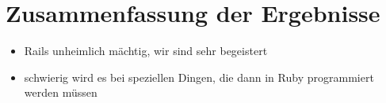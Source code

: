 \chapter{Zusammenfassung der Ergebnisse}\label{ref:chaptConclusion}
\begin{k}
\begin{itemize}
  \item Rails unheimlich mächtig, wir sind sehr begeistert
  \item schwierig wird es bei speziellen Dingen, die dann in Ruby programmiert
  werden müssen
\end{itemize}
\end{k}